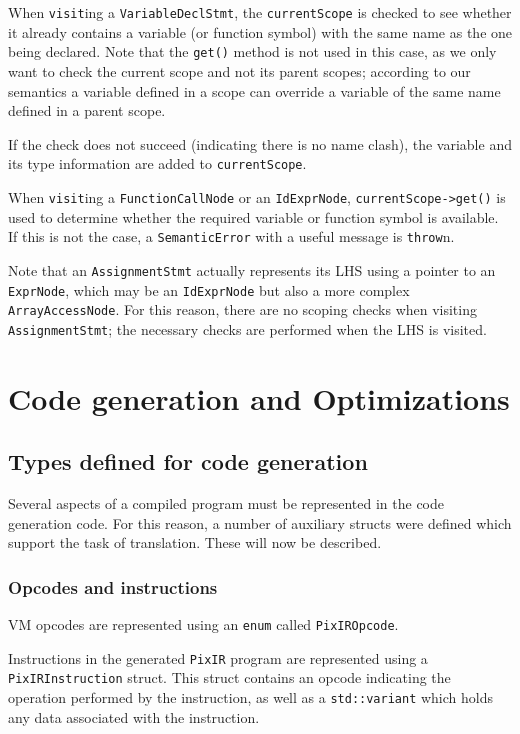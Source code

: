 \documentclass[11pt,a4paper]{scrartcl}
\begin{document}
When \verb|visit|ing a \verb|VariableDeclStmt|, the \verb|currentScope| is checked to see whether it already contains a variable (or function symbol) with the same name as the one being declared. Note that the \verb|get()| method is not used in this case, as we only want to check the current scope and not its parent scopes; according to our semantics a variable defined in a scope can override a variable of the same name defined in a parent scope.

If the check does not succeed (indicating there is no name clash), the variable and its type information are added to \verb|currentScope|.

When \verb|visit|ing a \verb|FunctionCallNode| or an \verb|IdExprNode|, \verb|currentScope->get()| is used to determine whether the required variable or function symbol is available. If this is not the case, a \verb|SemanticError| with a useful message is \verb|throw|n.

Note that an \verb|AssignmentStmt| actually represents its LHS using a pointer to an \verb|ExprNode|, which may be an \verb|IdExprNode| but also a more complex \verb|ArrayAccessNode|. For this reason, there are no scoping checks when visiting \verb|AssignmentStmt|; the necessary checks are performed when the LHS is visited.

\newpage

\section{Code generation and Optimizations}

\subsection{Types defined for code generation}

Several aspects of a compiled program must be represented in the code generation code. For this reason, a number of auxiliary structs were defined which support the task of translation. These will now be described.

\subsubsection{Opcodes and instructions}

VM opcodes are represented using an \verb|enum| called \verb|PixIROpcode|.

Instructions in the generated \verb|PixIR| program are represented using a \verb|PixIRInstruction| struct. This struct contains an opcode indicating the operation performed by the instruction, as well as a \verb|std::variant| which holds any data associated with the instruction.
\end{document}
